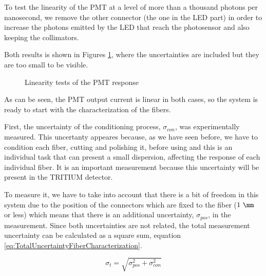 To test the linearity of the PMT at a level of more than a thousand photons per nanosecond, we remove the other connector (the one in the LED part) in order to increase the photons emitted by the LED that reach the photosensor and also keeping the collimators.

Both results is shown in Figures \ref{fig:LinearityRangesOfPMT}, where the uncertainties are included but they are too small to be visible.

\begin{figure}[h]
 \centering
    \newline
 \caption{Linearity tests of the PMT response}
 \label{fig:LinearityRangesOfPMT}
\end{figure}

As can be seen, the PMT output current is linear in both cases, so the system is ready to start with the characterization of the fibers.

First, the uncertainty of the conditioning process, $\sigma_{con}$, was experimentally measured. This uncertanty appeares because, as we have seen before, we have to condition each fiber, cutting and polishing it, before using and this is an individual task that can present a small dispersion, affecting the response of each individual fiber. It is an important measurement because this uncertainty will be present in the TRITIUM detector.

To measure it, we have to take into account that there is a bit of freedom in this system due to the position of the connectors which are fixed to the fiber ($1~\mm$ or less) which means that there is an additional uncertainty, $\sigma_{pos}$, in the measurement. Since both uncertainties are not related, the total measurement uncertainty can be calculated as a square sum, equation \ref{eq:TotalUncertaintyFiberCharacterization}.

\begin{equation}
\sigma_{t} = \sqrt{\sigma^2_{pos} + \sigma^2_{con} }
\label{eq:TotalUncertaintyFiberCharacterization}
\end{equation}

